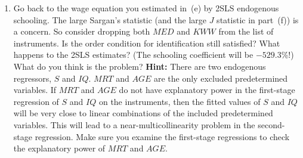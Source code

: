 \begin{problemset}
\begin{enumerate}[label=(\alph*)]
\item Go back to the wage equation you estimated in~(e) by 2SLS endogenous schooling.
  The large Sargan's statistic (and the large $J$ statistic in part~(f)) is a concern.
  So consider dropping both $MED$ and $KWW$ from the list of instruments.
  Is the order condition for identification still satisfied?  What happens to the
  2SLS estimates?  (The schooling coefficient will be $-529.3$\%!)  What do you
  think is the problem?  \textbf{Hint:} There are two endogenous regressors, $S$ and $IQ$.
  $MRT$ and $AGE$ are the only excluded predetermined variables.  If $MRT$ and $AGE$
  do not have explanatory power in the first-stage regression of $S$ and $IQ$
  on the instruments, then the fitted values of $S$ and $IQ$ will be very close to linear
  combinations of the included predetermined variables.  This will lead to a near-multicollinearity
  problem in the second-stage regression.  Make sure you examine
  the first-stage regressions to check the explanatory power of $MRT$ and $AGE$.
\end{enumerate}

\end{problemset}

